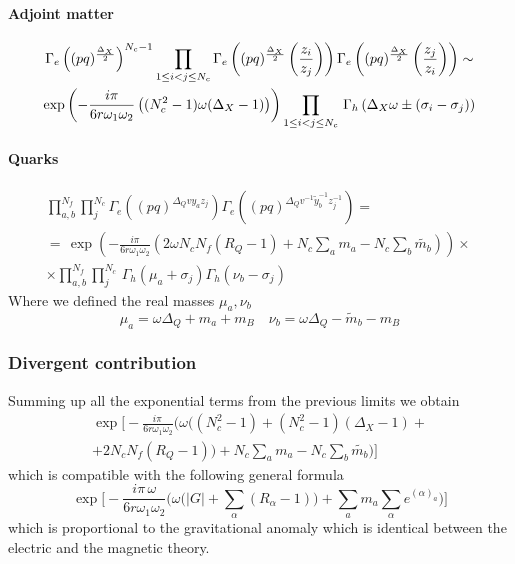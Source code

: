 \paragraph{Adjoint matter}

\begin{multline}
 \Gamma_e \left((pq)^{\frac{\Delta_X}{2}} \right)^{N_c -1} 
 \prod_{1 \leq i <j \leq N_c} 
\Gamma_e \left( (pq)^{\frac{\Delta_X}{2}} \left( { z_i \over z_j} \right) \right) \Gamma_e \left( (pq)^{\frac{\Delta_X}{2}} \left( { z_j \over z_i} \right) \right) \sim \\
 \exp \left(- \frac{i \pi} {6 r \omega_1 \omega_2 }  \left( (N_c^2-1) \omega (\Delta_X - 1)  \right) \right)   \prod_{1 \leq i <j \leq N_c} 
  \, \Gamma_h \left( \Delta_X \omega \pm (\sigma_i - \sigma_j) \right) 
\end{multline}


\paragraph{Quarks}

\begin{multline}
\prod_{a,b}^{N_f} \prod_{j}^{N_c}
\Gamma_e\left(
(pq)^{\Delta_Q v y_a z_j }\right) 
\Gamma_e\left(
(pq)^{\Delta_Q v^{-1} \tilde{y}_b^{-1} z_j^{-1} } \right)  = \\
=\, \exp \left( {- \frac{i \pi} {6 r \omega_1 \omega_2 }  ( 2 \omega N_c N_f  (R_Q - 1) + N_c \sum_a m_a - N_c \sum_b \tilde {m_b} )} \right) \times  \, 
\\
\times
\prod_{a,b}^{N_f} \prod_{j}^{N_c}
 \, \Gamma_h ( \mu_a + \sigma_j) \Gamma_h ( \nu_b- \sigma_j)
\end{multline}
Where we defined the real masses $\mu_a,\nu_b$
\begin{equation}
 \mu_a = \omega \Delta_Q + m_a + m_B  \quad  \nu_b = \omega \Delta_Q - \tilde m_b - m_B
\end{equation}

\subsubsection{Divergent contribution}
Summing up all the exponential terms from the previous limits we obtain
\begin{multline}
 \exp 
 \biggl[
 -\frac{i \pi\,  } {6 r \omega_1 \omega_2 }   
 \biggl(
 \omega \biggl(   (N_c^2 -1) +  (N_c^2 - 1) (\Delta_X -1) + \\ 
   + 2  N_c N_f  (R_Q - 1) \biggr) 
    + N_c \sum_a m_a - N_c \sum_b \tilde {m_b} \biggr)
\biggr]
\end{multline}
which is compatible with the following general formula \cite{Aharony:2013dha}
\begin{equation}
 \exp 
 \biggl[
 -\frac{i \pi\,  \omega} {6 r \omega_1 \omega_2 }   
 \biggl(
 \omega \biggl(
  |G| + \sum_{\alpha}(R_{ \alpha} -1 ) 
  \biggr)
   + \sum_a m_a \sum_{\alpha} e^{(\alpha)_a}
 \biggr)
\biggl]
\end{equation}
which is proportional to the gravitational anomaly \cite{Aharony:2013dha}
which is identical between the electric and the magnetic theory.

